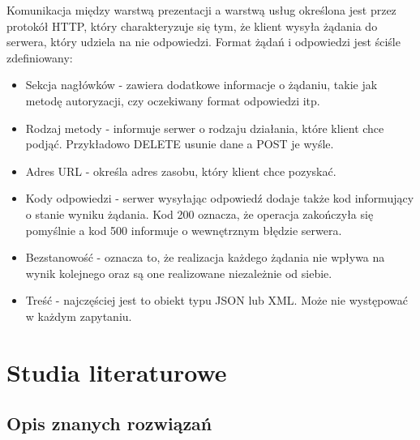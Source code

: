 Komunikacja między warstwą prezentacji a warstwą usług określona jest przez protokół HTTP, który charakteryzuje się tym, że klient wysyła żądania do serwera, który udziela na nie odpowiedzi. Format żądań i odpowiedzi jest ściśle zdefiniowany:
\begin{itemize}
\item Sekcja nagłówków - zawiera dodatkowe informacje o żądaniu, takie jak metodę autoryzacji, czy oczekiwany format odpowiedzi itp.
\item Rodzaj metody - informuje serwer o rodzaju działania, które klient chce podjąć. Przykładowo DELETE usunie dane a POST je wyśle.
\item Adres URL - określa adres zasobu, który klient chce pozyskać.
\item Kody odpowiedzi - serwer wysyłając odpowiedź dodaje także kod informujący o stanie wyniku żądania. Kod 200 oznacza, że operacja zakończyła się pomyślnie a kod 500 informuje o wewnętrznym błędzie serwera.
\item Bezstanowość - oznacza to, że realizacja każdego żądania nie wpływa na wynik kolejnego oraz są one realizowane niezależnie od siebie.
\item Treść - najczęściej jest to obiekt typu JSON lub XML. Może nie występować w każdym zapytaniu.
\end{itemize}


\section{Studia literaturowe}

\subsection{Opis znanych rozwiązań}

